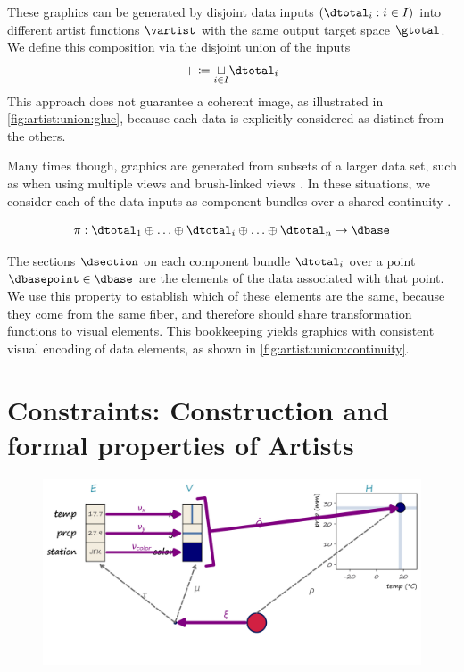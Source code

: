 \documentclass[10pt,journal,compsoc]{IEEEtran}
\theoremstyle{definition}
\theoremstyle{remark}
\begin{document}
These graphics can be generated by disjoint data inputs  $(\dtotal_i: i\in I)$ into different artist functions $\vartist$ with the same output target space $\gtotal$. We define this composition via the disjoint union of the inputs 
\begin{equation}
  \label{eq:artist:union:glue}
+ \coloneqq \underset{i\in I}{\sqcup} \dtotal_{i}
\end{equation}
This approach does not guarantee a coherent image, as illustrated in \autoref{fig:artist:union:glue}, because each data is explicitly considered as distinct from the others. 

Many times though, graphics are generated from subsets of a larger data set, such as when using multiple views \cite{alboRadarComparativeEvaluation2016a, hullmanKeeping2018} and brush-linked views \cite{beckerBrushingScatterplots1987,bujaInteractiveData1991}. In these situations, we consider each of the data inputs as component bundles over a shared continuity \dbase. 

\begin{equation}
  \label{eq:math:data:base:decompose}
  \pi:\dtotal_1\oplus\ldots\oplus \dtotal_i \oplus\ldots \oplus \dtotal_n \rightarrow \dbase
\end{equation}

The sections $\dsection$ on each component bundle $\dtotal_i$ over a point $\dbasepoint \in \dbase$ are the elements of the data associated with that point. We use this property to establish which of these elements are the same, because they come from the same fiber, and therefore should share transformation functions to visual elements. This bookkeeping yields graphics with consistent visual encoding of data elements, as shown in \autoref{fig:artist:union:continuity}. 


\section{Constraints: Construction and formal properties of Artists}
\label{sec:artist:construction}
\begin{figure}[h!]
  \includegraphics[width=\linewidth]{q.png}
  \caption{}
  \label{fig:constraints:q-overall}
\end{figure}
\end{document}
